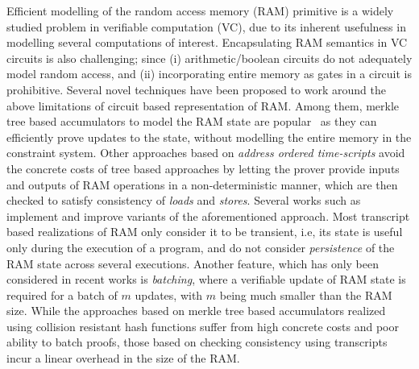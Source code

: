 Efficient modelling of the random access memory (RAM) primitive is a widely studied problem in
verifiable computation (VC), due to its inherent usefulness in modelling several computations of interest.
Encapsulating RAM semantics in VC circuits is also challenging; since (i) arithmetic/boolean circuits do not
adequately model random access, and (ii) incorporating entire memory as gates in a circuit is prohibitive.
Several novel techniques have been proposed to work around the above limitations of circuit based representation
of RAM. Among them, merkle tree based accumulators to model the RAM state are popular~\cite{EPRINT:BFRSBW13,compwithstate,C:BCTV14} as they can efficiently
prove updates to the state, without modelling the entire memory in the constraint system. Other
approaches based on {\em address ordered time-scripts} avoid the concrete costs of tree based approaches
by letting the prover provide inputs and outputs of RAM operations in a non-deterministic manner, which
are then checked to satisfy consistency of {\em loads} and {\em stores}.
Several works such as \cite{NDSS:WSRBW15,USENIX:BCTV14,C:BCGTV13,SP:ZGKPP18} implement and improve variants
of the aforementioned approach. Most transcript based realizations of RAM only consider it to be transient,
i.e, its state is useful only during the execution of a program, and do not consider {\em persistence} of the
RAM state across several executions. Another feature, which has only been considered in recent works
\cite{USENIX:OWWB20,CCS:CFHKKO22} is {\em batching}, where a verifiable update of RAM state is required
for a batch of $m$ updates, with $m$ being much smaller than the RAM size. While the approaches based on merkle tree
based accumulators realized using collision resistant hash functions suffer from high concrete costs and poor
ability to batch proofs, those based on checking consistency using transcripts incur a linear overhead in the
size of the RAM.


